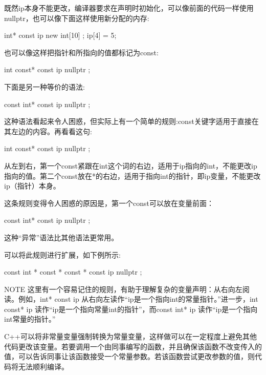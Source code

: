 既然ip本身不能更改，编译器要求在声明时初始化，可以像前面的代码一样使用nullptr，也可以像下面这样使用新分配的内存:

\begin{cpp}
int* const ip { new int[10] };
ip[4] = 5;
\end{cpp}

也可以像这样把指针和所指向的值都标记为const:

\begin{cpp}
int const* const ip { nullptr };
\end{cpp}

下面是另一种等价的语法:

\begin{cpp}
const int* const ip { nullptr };
\end{cpp}

这种语法看起来令人困惑，但实际上有一个简单的规则:const关键字适用于直接在其左边的内容。再看看这句:

\begin{cpp}
int const* const ip { nullptr };
\end{cpp}

从左到右，第一个const紧跟在int这个词的右边，适用于ip指向的int，不能更改ip指向的值。第二个const放在*的右边，适用于指向int的指针，即ip变量，不能更改ip（指针）本身。

这条规则变得令人困惑的原因是，第一个const可以放在变量前面：

\begin{cpp}
const int* const ip { nullptr };
\end{cpp}

这种“异常”语法比其他语法更常用。

可以将此规则进行扩展，如下例所示:

\begin{cpp}
const int * const * const * const ip { nullptr };
\end{cpp}

\begin{myNotic}{NOTE}
这里有一个容易记住的规则，有助于理解复杂的变量声明：从右向左阅读。例如，int* const ip 从右向左读作“ip是一个指向int的常量指针。”进一步，int const* ip 读作“ip是一个指向常量int的指针”，而const int* ip 读作“ip是一个指向int常量的指针。”
\end{myNotic}


C++可以将非常量变量强制转换为常量变量，这样做可以在一定程度上避免其他代码更改该变量。若要调用一个由同事编写的函数，并且确保该函数不改变传入的值，可以告诉同事让该函数接受一个常量参数。若该函数尝试更改参数的值，则代码将无法顺利编译。

